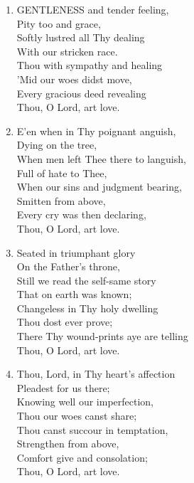 \documentclass[11pt,a4paper]{article}
\begin{document}
\begin{enumerate}
    \item GENTLENESS and tender feeling, \\
            Pity too and grace, \\
        Softly lustred all Thy dealing \\
            With our stricken race. \\
        Thou with sympathy and healing \\
            'Mid our woes didst move, \\
        Every gracious deed revealing \\
            Thou, O Lord, art love.

    \item E'en when in Thy poignant anguish, \\
            Dying on the tree, \\
        When men left Thee there to languish, \\
            Full of hate to Thee, \\
        When our sins and judgment bearing, \\
            Smitten from above, \\
        Every cry was then declaring, \\
            Thou, O Lord, art love.

    \item Seated in triumphant glory \\
            On the Father's throne, \\
        Still we read the self-same story \\
            That on earth was known; \\
        Changeless in Thy holy dwelling \\
            Thou dost ever prove; \\
        There Thy wound-prints aye are telling \\
            Thou, O Lord, art love.

    \item Thou, Lord, in Thy heart's affection \\
            Pleadest for us there; \\
        Knowing well our imperfection, \\
            Thou our woes canst share; \\
        Thou canst succour in temptation, \\
            Strengthen from above, \\
        Comfort give and consolation; \\
            Thou, O Lord, art love.


\end{enumerate}
\end{document}
